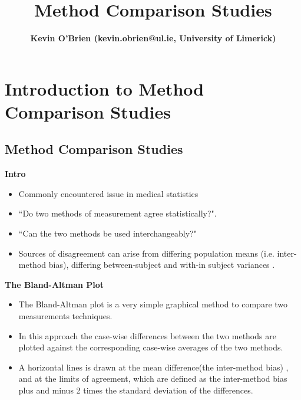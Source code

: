 \documentclass[compress]{beamer}        %
\title
{
{\huge Method Comparison Studies \\[0.3cm] }
}
\author[Kevin O'Brien]{{\bf Kevin O'Brien (kevin.obrien@ul.ie, University of Limerick)}}
\institute[University of Limerick, Maths \& Stats Dept]{}
\date{}
\makeatletter
\newcommand{\tcb}{\textcolor{beamer@blendedblue}}
\makeatother
\begin{document}
\begin{frame}
\vspace{-0.4cm}
\titlepage
\end{frame}





\section[Intro to MCS]{Introduction to Method Comparison Studies}
\subsection{Method Comparison Studies}
\begin{frame}{\bf \tcb{Intro}}
\begin{itemize}\itemsep0.7cm
\item Commonly encountered issue in medical statistics
\item ``Do two methods of measurement agree statistically?".
\item ``Can the two methods be used interchangeably?"
\item Sources of disagreement can arise from differing population means (i.e. inter-method bias), differing between-subject and with-in subject variances \cite{Roy2009}.
\end{itemize}
\end{frame}

\begin{frame}{\bf \tcb{The Bland-Altman Plot}}
\begin{itemize}\itemsep0.7cm

\item The Bland-Altman plot \cite{BA86,BA99} is a very simple graphical method to compare two measurements techniques. \item In this approach the case-wise differences between the two methods are plotted against the corresponding case-wise averages of the two methods.

\item A horizontal lines is drawn at the mean difference(the inter-method bias) , and at the limits of agreement, which are defined as the inter-method bias plus and minus 2 times the standard deviation of the differences.

\end{itemize}
\end{frame}
\end{document}
